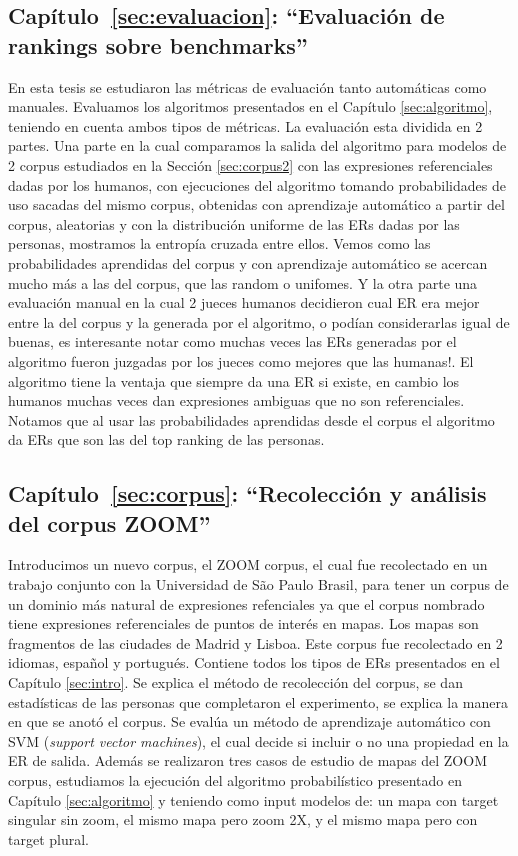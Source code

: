 \subsection{Cap\'itulo~\ref{sec:evaluacion}: ``Evaluaci\'on de rankings sobre benchmarks''} 
En esta tesis se estudiaron las m\'etricas de evaluaci\'on tanto autom\'aticas como manuales. Evaluamos los algoritmos presentados 
en el Cap\'itulo \ref{sec:algoritmo}, teniendo en cuenta ambos tipos de m\'etricas. La evaluaci\'on esta dividida en 2 partes. 
Una parte en la cual comparamos la salida del algoritmo para modelos de 2 corpus estudiados en la Secci\'on \ref{sec:corpus2} con
 las expresiones referenciales dadas por los humanos, con ejecuciones del algoritmo tomando probabilidades de uso sacadas del mismo corpus, 
obtenidas con aprendizaje autom\'atico a partir del corpus, aleatorias y con la distribuci\'on uniforme de las ERs dadas por las personas, 
mostramos la entrop\'ia cruzada entre ellos. Vemos como las probabilidades aprendidas del corpus y con aprendizaje autom\'atico se acercan 
mucho m\'as a las del corpus, que las random o unifomes. Y la otra parte una evaluaci\'on manual en la cual 2 jueces humanos decidieron cual
 ER era mejor entre la del corpus y la generada por el algoritmo, o pod\'ian considerarlas igual de buenas, es interesante notar como muchas 
veces las ERs generadas por el algoritmo fueron juzgadas por los jueces como mejores que las humanas!. El algoritmo tiene la ventaja que
 siempre da una ER si existe, en cambio los humanos muchas veces dan expresiones ambiguas que no son referenciales. Notamos que al usar 
las probabilidades aprendidas desde el corpus el algoritmo da ERs que son las del top ranking de las personas.

\subsection{Cap\'itulo~\ref{sec:corpus}: ``Recolecci\'on y an\'alisis del corpus ZOOM''} Introducimos un nuevo corpus, 
el ZOOM corpus, el cual fue recolectado en un trabajo conjunto con la Universidad de S\~ao Paulo Brasil, 
para tener un corpus de un dominio m\'as natural de expresiones refenciales ya que el corpus nombrado tiene expresiones referenciales 
de puntos de inter\'es en mapas. Los mapas son fragmentos de las ciudades de Madrid y Lisboa. Este corpus fue recolectado en 2 idiomas, 
espa\~nol y portugu\'es. Contiene todos los tipos de ERs presentados en el Cap\'itulo \ref{sec:intro}. Se explica el m\'etodo de recolecci\'on del corpus, se dan estad\'isticas de las personas que completaron el 
experimento, se explica la manera en que se anot\'o el corpus. Se eval\'ua un m\'etodo de aprendizaje autom\'atico con SVM ({\it support vector machines}), el cual decide si incluir o no una propiedad en la ER de salida. Adem\'as se realizaron tres casos de estudio de mapas del ZOOM corpus, estudiamos la ejecuci\'on del algoritmo probabil\'istico presentado en Cap\'itulo \ref{sec:algoritmo} y teniendo como input modelos de: un mapa con target singular sin zoom, el mismo mapa pero zoom 2X, y el mismo mapa pero con target plural.

